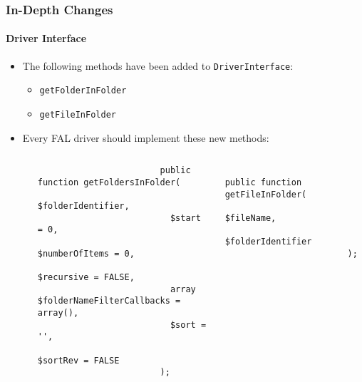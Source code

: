 \begin{frame}[fragile]
	\frametitle{In-Depth Changes}
	\framesubtitle{Driver Interface}

	\lstset{basicstyle=\tiny\ttfamily}

	\begin{itemize}

		\item The following methods have been added to \texttt{DriverInterface}:

			\begin{itemize}
				\item \texttt{getFolderInFolder}
				\item \texttt{getFileInFolder}
			\end{itemize}

		\item Every FAL driver should implement these new methods:

			\begin{columns}[T]
				\begin{column}{.07\textwidth}
                \end{column}
				\begin{column}{.465\textwidth}

					\begin{lstlisting}
						public function getFoldersInFolder(
						  $folderIdentifier,
						  $start = 0,
						  $numberOfItems = 0,
						  $recursive = FALSE,
						  array $folderNameFilterCallbacks = array(),
						  $sort = '',
						  $sortRev = FALSE
						);
					\end{lstlisting}

                \end{column}
				\begin{column}{.465\textwidth}

					\begin{lstlisting}
						public function getFileInFolder(
						  $fileName,
						  $folderIdentifier
						);
					\end{lstlisting}

				\end{column}
			\end{columns}

	\end{itemize}

	\breakingchange

\end{frame}


